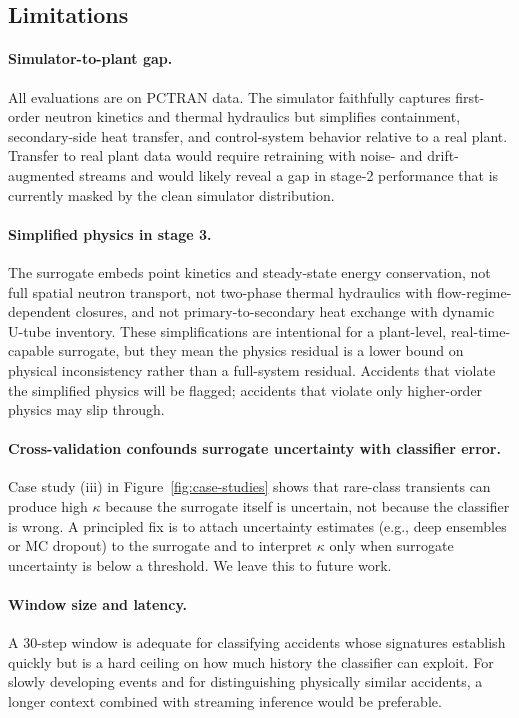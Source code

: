 \subsection{Limitations}

\paragraph{Simulator-to-plant gap.} All evaluations are on PCTRAN data. The simulator faithfully captures first-order neutron kinetics and thermal hydraulics but simplifies containment, secondary-side heat transfer, and control-system behavior relative to a real plant. Transfer to real plant data would require retraining with noise- and drift-augmented streams and would likely reveal a gap in stage-2 performance that is currently masked by the clean simulator distribution.

\paragraph{Simplified physics in stage 3.} The surrogate embeds point kinetics and steady-state energy conservation, not full spatial neutron transport, not two-phase thermal hydraulics with flow-regime-dependent closures, and not primary-to-secondary heat exchange with dynamic U-tube inventory. These simplifications are intentional for a plant-level, real-time-capable surrogate, but they mean the physics residual is a lower bound on physical inconsistency rather than a full-system residual. Accidents that violate the simplified physics will be flagged; accidents that violate only higher-order physics may slip through.

\paragraph{Cross-validation confounds surrogate uncertainty with classifier error.} Case study (iii) in Figure~\ref{fig:case-studies} shows that rare-class transients can produce high $\kappa$ because the surrogate itself is uncertain, not because the classifier is wrong. A principled fix is to attach uncertainty estimates (e.g., deep ensembles or MC dropout) to the surrogate and to interpret $\kappa$ only when surrogate uncertainty is below a threshold. We leave this to future work.

\paragraph{Window size and latency.} A 30-step window is adequate for classifying accidents whose signatures establish quickly but is a hard ceiling on how much history the classifier can exploit. For slowly developing events and for distinguishing physically similar accidents, a longer context combined with streaming inference would be preferable.

